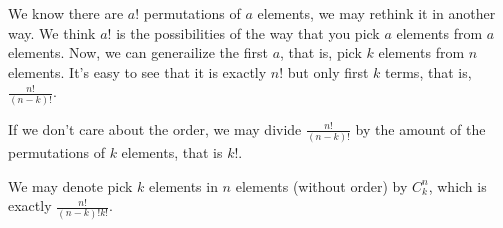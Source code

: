 \documentclass[../main.tex]{subfiles}
\begin{document}
We know there are $a!$ permutations of $a$ elements,
we may rethink it in another way. We think $a!$ is the possibilities of the way
that you pick $a$ elements from $a$ elements.
Now, we can generailize the first $a$, that is, pick $k$ elements from $n$ elements.
It's easy to see that it is exactly $n!$ but only first $k$ terms, that is, $\frac{n!}{(n - k)!}$.

If we don't care about the order, we may divide $\frac{n!}{(n - k)!}$ by the
amount of the permutations of $k$ elements, that is $k!$.

We may denote pick $k$ elements in $n$ elements (without order) by $C^n_k$,
which is exactly $\frac{n!}{(n - k)! k!}$.
\end{document}
